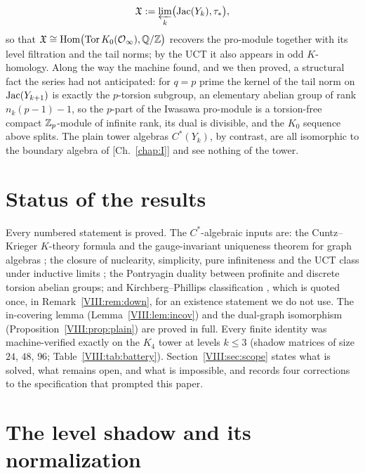 \begin{chapterabstract}
\[\mathfrak{X}:=\varprojlim_k\bigl(\operatorname{Jac}(Y_k),\tau_*\bigr),
\]
so that $\mathfrak{X}\cong\operatorname{Hom}\bigl(\operatorname{Tor} K_0(\mathcal{O}_\infty),\mathbb{Q}/\mathbb{Z}\bigr)$ recovers the pro-module
together with its level filtration and the tail norms; by the UCT it also appears in
odd $K$-homology. Along the way the machine found, and we then proved, a structural
fact the series had not anticipated: for $q=p$ prime the kernel of the tail norm on
$\operatorname{Jac}(Y_{k+1})$ is exactly the $p$-torsion subgroup, an elementary abelian group of rank
$n_k(p-1)-1$, so the $p$-part of the Iwasawa pro-module is a torsion-free compact
$\mathbb{Z}_p$-module of infinite rank, its dual is divisible, and the $K_0$ sequence above
splits. The plain tower algebras $C^*(Y_k)$, by contrast, are all isomorphic to the
boundary algebra of [Ch.~\ref{chap:I}] and see nothing of the tower.
\end{chapterabstract}

\section*{Status of the results}

Every numbered statement is proved. The $C^*$-algebraic inputs are: the
Cuntz--Krieger $K$-theory formula and the gauge-invariant uniqueness theorem for graph
algebras \cite{R}; the closure of nuclearity, simplicity, pure infiniteness and the UCT
class under inductive limits \cite{KR,Ro,RS}; the Pontryagin duality between profinite
and discrete torsion abelian groups; and Kirchberg--Phillips classification \cite{Ph},
which is quoted once, in Remark~\ref{VIII:rem:down}, for an existence statement we do not
use. The in-covering lemma (Lemma~\ref{VIII:lem:incov}) and the dual-graph isomorphism
(Proposition~\ref{VIII:prop:plain}) are proved in full. Every finite identity was
machine-verified exactly on the $K_4$ tower at levels $k\le3$ (shadow matrices of size
$24$, $48$, $96$; Table~\ref{VIII:tab:battery}). Section~\ref{VIII:sec:scope} states what is
solved, what remains open, and what is impossible, and records four corrections to the
specification that prompted this paper.

\section{The level shadow and its normalization}\label{VIII:sec:level}


